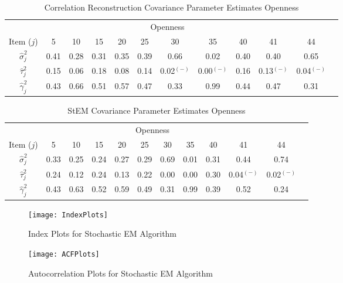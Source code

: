 \documentclass[12pt]{article}
\begin{document}
\begin{table}[tbp]
\begin{center}
\begin{tabular}{|c||c|c|c|c|c|c|c|c|c|c|c|}
\hline
\multicolumn{11}{|c|}{Openness} &  \\ \cline{1-11}
Item ($j$)  & 5 & 10 & 15 & 20 & 25 & 30 & 35 & 40 & 41 & 44 &  \\ \cline{1-11}
$\hat{\sigma}_j^2$ & 0.41 & 0.28 & 0.31 & 0.35 & 0.39 & 0.66 & 
0.02 & 0.40 & 0.40 & 0.65 &  \\ \cline{1-11}
$\hat{\tau}_j^2$ & 0.15 & 0.06 & 0.18 & 0.08 & 0.14 & 0.02$^{(-)}$ & 0.00$^{(-)}$ & 0.16 & 0.13$^{(-)}$ & 0.04$^{(-)}$ &  \\ \cline{1-11}
$\hat{\gamma}_j^2$ & 0.43 & 0.66 & 0.51 & 0.57 & 0.47 & 0.33 & 
0.99 & 0.44 & 0.47 & 0.31 &  \\ \cline{1-11}
\end{tabular}%
\end{center}
\caption{Correlation Reconstruction Covariance Parameter Estimates Openness}
\label{rcopars}
\end{table}
\begin{table}[tbp]
\begin{center}
\begin{tabular}{|c||c|c|c|c|c|c|c|c|c|c|c|}
\hline
\multicolumn{11}{|c|}{Openness} &  \\ \cline{1-11}
Item ($j$) & 5 & 10 & 15 & 20 & 25 & 30 & 35 & 40 & 41 & 44 &  \\ \cline{1-11}
$\hat{\sigma}_j^2$ & 0.33 & 0.25 & 0.24 & 0.27 & 0.29 & 0.69 & 
0.01 & 0.31 & 0.44 & 0.74 &  \\ \cline{1-11}
$\hat{\tau}_j^2$ & 0.24 & 0.12 & 0.24 & 0.13 & 0.22 & 0.00 & 0.00
& 0.30 & 0.04$^{(-)}$ & 0.02$^{(-)}$ &  \\ \cline{1-11}
$\hat{\gamma}_j^2$ & 0.43 & 0.63 & 0.52 & 0.59 & 0.49 & 0.31 & 
0.99 & 0.39 & 0.52 & 0.24 &  \\ \cline{1-11}
\end{tabular}%
\end{center}
\caption{StEM Covariance Parameter Estimates Openness}
\label{stemopars}
\end{table}

\begin{figure}[h]
	\label{IndexPlots}\centerline{\texttt{[image: IndexPlots]}} 
	\caption{Index Plots for Stochastic EM Algorithm}
\end{figure}

\begin{figure}[!ht]
	\label{acfplots}\centerline{\texttt{[image: ACFPlots]}} 
	\caption{Autocorrelation Plots for Stochastic EM Algorithm}
\end{figure}
\end{document}
